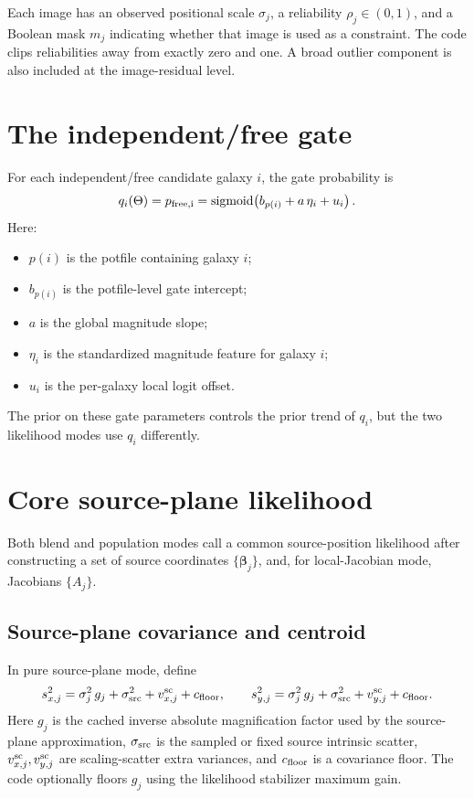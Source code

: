 \documentclass[11pt]{article}
\newcommand{\sigmoid}{\operatorname{sigmoid}}
\begin{document}
Each image has an observed positional scale $\sigma_j$, a reliability
$\rho_j \in (0,1)$, and a Boolean mask $m_j$ indicating whether that image is
used as a constraint. The code clips reliabilities away from exactly zero and
one. A broad outlier component is also included at the image-residual level.

\section{The independent/free gate}

For each independent/free candidate galaxy $i$, the gate probability is
\[
    q_i(\Theta)
    =
    p_{\rm free,i}
    =
    \sigmoid\!\left(
        b_{p(i)}
        +
        a\,\eta_i
        +
        u_i
    \right).
\]
Here:
\begin{itemize}
    \item $p(i)$ is the potfile containing galaxy $i$;
    \item $b_{p(i)}$ is the potfile-level gate intercept;
    \item $a$ is the global magnitude slope;
    \item $\eta_i$ is the standardized magnitude feature for galaxy $i$;
    \item $u_i$ is the per-galaxy local logit offset.
\end{itemize}
The prior on these gate parameters controls the prior trend of $q_i$, but the
two likelihood modes use $q_i$ differently.

\section{Core source-plane likelihood}

Both blend and population modes call a common source-position likelihood after
constructing a set of source coordinates $\{\bm{\beta}_j\}$, and, for
local-Jacobian mode, Jacobians $\{A_j\}$.

\subsection{Source-plane covariance and centroid}

In pure source-plane mode, define
\[
    s_{x,j}^2
    =
    \sigma_j^2\,g_j
    +
    \sigma_{\rm src}^2
    +
    v_{x,j}^{\rm sc}
    +
    c_{\rm floor},
    \qquad
    s_{y,j}^2
    =
    \sigma_j^2\,g_j
    +
    \sigma_{\rm src}^2
    +
    v_{y,j}^{\rm sc}
    +
    c_{\rm floor}.
\]
Here $g_j$ is the cached inverse absolute magnification factor used by the
source-plane approximation, $\sigma_{\rm src}$ is the sampled or fixed source
intrinsic scatter, $v_{x,j}^{\rm sc},v_{y,j}^{\rm sc}$ are scaling-scatter
extra variances, and $c_{\rm floor}$ is a covariance floor. The code optionally
floors $g_j$ using the likelihood stabilizer maximum gain.
\end{document}
